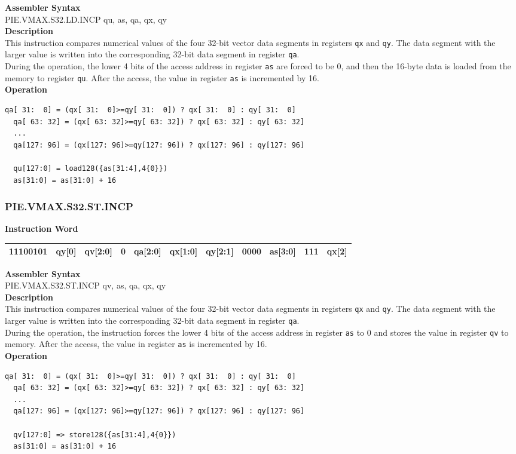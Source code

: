 \textbf{Assembler Syntax} \\
PIE.VMAX.S32.LD.INCP qu, as, qa, qx, qy \\
\textbf{Description} \\
This instruction compares numerical values of the four 32-bit vector data segments in registers \lstinline{qx} and \lstinline{qy}. The data segment with the larger value is written into the corresponding 32-bit data segment in register \lstinline{qa}.\\
During the operation, the lower 4 bits of the access address in register \lstinline{as} are forced to be 0, and then the 16-byte data is loaded from the memory to register \lstinline{qu}. After the access, the value in register \lstinline{as} is incremented by 16.\\
\textbf{Operation}
\begin{lstlisting}[escapeinside=`?]
  qa[ 31:  0] = (qx[ 31:  0]>=qy[ 31:  0]) ? qx[ 31:  0] : qy[ 31:  0]
  qa[ 63: 32] = (qx[ 63: 32]>=qy[ 63: 32]) ? qx[ 63: 32] : qy[ 63: 32]
  ...
  qa[127: 96] = (qx[127: 96]>=qy[127: 96]) ? qx[127: 96] : qy[127: 96]

  qu[127:0] = load128({as[31:4],4{0}})
  as[31:0] = as[31:0] + 16
\end{lstlisting}

\newpage
\subsubsection{PIE.VMAX.S32.ST.INCP}\label{instruction:PIEVMAXS32STINCP}
\setlength\tabcolsep{6pt}
\textbf{Instruction Word} \\
\begin{tabular}{|c|c|c|c|c|c|c|c|c|c|c|}
	\hline
	11100101 & qy[0] & qv[2:0] & 0 & qa[2:0] & qx[1:0] & qy[2:1] & 0000 & as[3:0] & 111 & qx[2] \\
	\hline
\end{tabular}

\textbf{Assembler Syntax} \\
PIE.VMAX.S32.ST.INCP qv, as, qa, qx, qy \\
\textbf{Description} \\
This instruction compares numerical values of the four 32-bit vector data segments in registers \lstinline{qx} and \lstinline{qy}. The data segment with the larger value is written into the corresponding 32-bit data segment in register \lstinline{qa}.\\
During the operation, the instruction forces the lower 4 bits of the access address in register \lstinline{as} to 0 and stores the value in register \lstinline{qv} to memory. After the access, the value in register \lstinline{as} is incremented by 16.\\
\textbf{Operation}
\begin{lstlisting}[escapeinside=`?]
  qa[ 31:  0] = (qx[ 31:  0]>=qy[ 31:  0]) ? qx[ 31:  0] : qy[ 31:  0]
  qa[ 63: 32] = (qx[ 63: 32]>=qy[ 63: 32]) ? qx[ 63: 32] : qy[ 63: 32]
  ...
  qa[127: 96] = (qx[127: 96]>=qy[127: 96]) ? qx[127: 96] : qy[127: 96]

  qv[127:0] => store128({as[31:4],4{0}})
  as[31:0] = as[31:0] + 16
\end{lstlisting}

